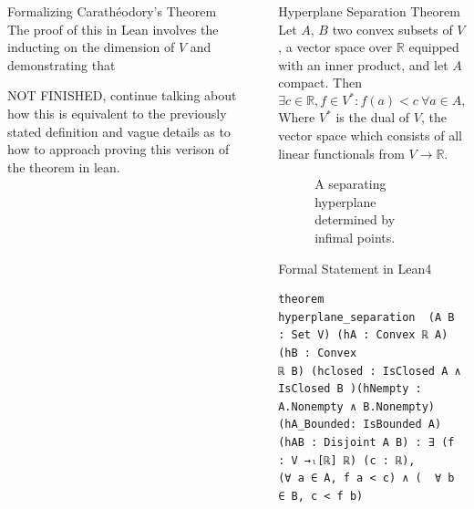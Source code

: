 \documentclass[final]{beamer}
\newlength{\sepwidth}
\newlength{\colwidth}
\newcommand{\separatorcolumn}{\begin{column}{\sepwidth}\end{column}}
\begin{document}
\begin{frame}[fragile]
\begin{columns}[t]
\begin{column}{\colwidth}
\begin{block}{Formalizing Carath\'eodory's Theorem}
              The proof of this in Lean involves the inducting on the dimension of $V$ and demonstrating that 

              NOT FINISHED,
              continue talking about how this is equivalent to the previously stated definition and vague details as to how to approach proving this verison of the theorem in lean. 
            \end{block}

            


            
            \begin{block*}
              
              

                
          
              
                  
                
            \end{block*}

            
        \end{column}

        \separatorcolumn

        \begin{column}{\colwidth}

            
            \begin{alertblock}{Hyperplane Separation Theorem}
                Let $A$, $B$ two convex subsets of $V$, a vector space over $\mathbb{R}$ equipped with an inner product, and let $A$ compact. Then \begin{equation}
                    \exists c\in \mathbb{R}, f \in V^*: f(a) < c\ \forall a\in A, \ c < f(b)\ \forall b\in B
                  \end{equation} Where $V^*$ is the dual of $V$, the vector space which consists of all linear functionals from $V\to \mathbb{R}$.
            \end{alertblock}

            \begin{figure}[htbp]
                \centering
                
                \caption{A separating hyperplane determined by infimal points. \label{fig:hyperplane-separation}}
            \end{figure}

\begin{block}{Formal Statement in Lean4}
\vspace{-0.5em}
\begin{Verbatim}
theorem hyperplane_separation  (A B : Set V) (hA : Convex ℝ A)(hB : Convex 
ℝ B) (hclosed : IsClosed A ∧ IsClosed B )(hNempty : A.Nonempty ∧ B.Nonempty) 
(hA_Bounded: IsBounded A) (hAB : Disjoint A B) : ∃ (f : V →ₗ[ℝ] ℝ) (c : ℝ),
(∀ a ∈ A, f a < c) ∧ (  ∀ b ∈ B, c < f b)
\end{Verbatim}
\end{block}


\end{column}
\end{columns}
\end{frame}
\end{document}

